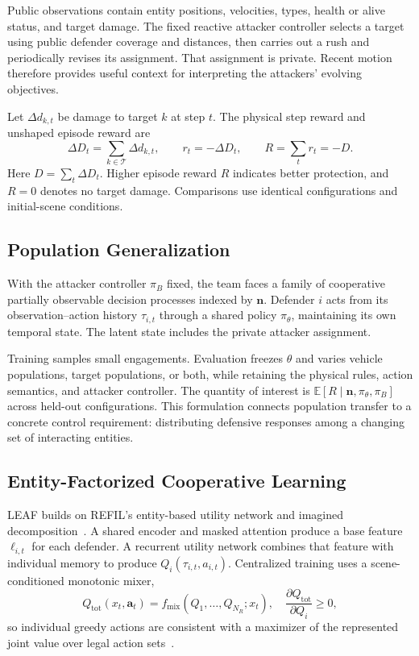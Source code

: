 Public observations contain entity positions, velocities, types, health or alive status, and target damage. The fixed reactive attacker controller selects a target using public defender coverage and distances, then carries out a rush and periodically revises its assignment. That assignment is private. Recent motion therefore provides useful context for interpreting the attackers' evolving objectives.

Let $\Delta d_{k,t}$ be damage to target $k$ at step $t$. The physical step reward and unshaped episode reward are
\begin{equation}
\Delta D_t=\sum_{k\in\mathcal T}\Delta d_{k,t},\qquad
r_t=-\Delta D_t,\qquad R=\sum_t r_t=-D.
\label{eq:damage}
\end{equation}
Here $D=\sum_t\Delta D_t$. Higher episode reward $R$ indicates better protection, and $R=0$ denotes no target damage. Comparisons use identical configurations and initial-scene conditions.

\subsection{Population Generalization}
With the attacker controller $\pi_B$ fixed, the team faces a family of cooperative partially observable decision processes indexed by $\mathbf n$. Defender $i$ acts from its observation--action history $\tau_{i,t}$ through a shared policy $\pi_\theta$, maintaining its own temporal state. The latent state includes the private attacker assignment.

Training samples small engagements. Evaluation freezes $\theta$ and varies vehicle populations, target populations, or both, while retaining the physical rules, action semantics, and attacker controller. The quantity of interest is $\mathbb E[R\mid\mathbf n,\pi_\theta,\pi_B]$ across held-out configurations. This formulation connects population transfer to a concrete control requirement: distributing defensive responses among a changing set of interacting entities.

\subsection{Entity-Factorized Cooperative Learning}
LEAF builds on REFIL's entity-based utility network and imagined decomposition~\cite{iqbal2021refil}. A shared encoder and masked attention produce a base feature $\ell_{i,t}$ for each defender. A recurrent utility network combines that feature with individual memory to produce $Q_i(\tau_{i,t},a_{i,t})$. Centralized training uses a scene-conditioned monotonic mixer,
\begin{equation}
Q_{\mathrm{tot}}(x_t,\boldsymbol a_t)=f_{\mathrm{mix}}(Q_1,\ldots,Q_{N_R};x_t),
\quad\frac{\partial Q_{\mathrm{tot}}}{\partial Q_i}\geq0,
\end{equation}
so individual greedy actions are consistent with a maximizer of the represented joint value over legal action sets~\cite{rashid2018qmix}.

